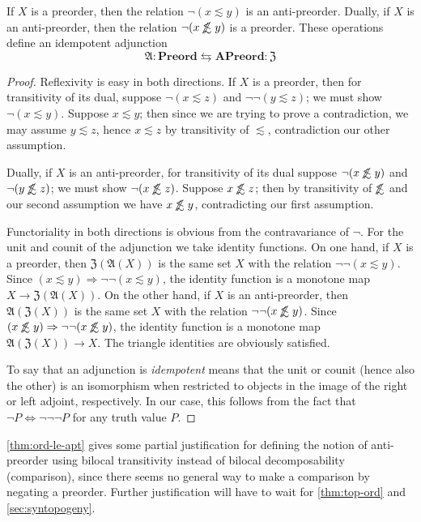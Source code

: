 \documentclass{article}
\def\oapt{\mathrel{\!\not\,\not\lesssim}}
\def\leapx{\lesssim}
\let\implies\Rightarrow
\def\anti{\mathfrak{A}}
\def\neigh{\mathfrak{Z}}
\def\Preord{\mathbf{Preord}}
\def\APreord{\mathbf{APreord}}
\begin{document}
\begin{thm}\label{thm:ord-le-apt}
  If $X$ is a preorder, then the relation $\neg(x\leapx y)$ is an anti-preorder.
  Dually, if $X$ is an anti-preorder, then the relation $\neg(x\oapt y)$ is a preorder.
  These operations define an idempotent adjunction
  \[\anti : \Preord \leftrightarrows \APreord : \neigh\]
\end{thm}
\begin{proof}
  Reflexivity is easy in both directions.
  If $X$ is a preorder, then for transitivity of its dual, suppose $\neg(x\leapx z)$ and $\neg\neg(y\leapx z)$; we must show $\neg(x\leapx y)$.
  Suppose $x\leapx y$; then since we are trying to prove a contradiction, we may assume $y\leapx z$, hence $x\leapx z$ by transitivity of $\leapx$, contradiction our other assumption.

  Dually, if $X$ is an anti-preorder, for transitivity of its dual suppose $\neg (x\oapt y)$ and $\neg (y\oapt z)$; we must show $\neg(x\oapt z)$.
  Suppose $x\oapt z$; then by transitivity of $\oapt$ and our second assumption we have $x\oapt y$, contradicting our first assumption.

  Functoriality in both directions is obvious from the contravariance of $\neg$.
  For the unit and counit of the adjunction we take identity functions.
  On one hand, if $X$ is a preorder, then $\neigh(\anti(X))$ is the same set $X$ with the relation $\neg\neg(x\leapx y)$.
  Since $(x\leapx y) \implies \neg\neg(x\leapx y)$, the identity function is a monotone map $X\to \neigh(\anti(X))$.
  On the other hand, if $X$ is an anti-preorder, then $\anti(\neigh(X))$ is the same set $X$ with the relation $\neg\neg(x\oapt y)$.
  Since $(x\oapt y) \implies \neg\neg(x\oapt y)$, the identity function is a monotone map $\anti(\neigh(X)) \to X$.
  The triangle identities are obviously satisfied.

  To say that an adjunction is \emph{idempotent} means that the unit or counit (hence also the other) is an isomorphism when restricted to objects in the image of the right or left adjoint, respectively.
  In our case, this follows from the fact that $\neg P \iff \neg\neg\neg P$ for any truth value $P$.
\end{proof}

\cref{thm:ord-le-apt} gives some partial justification for defining the notion of anti-preorder using bilocal transitivity instead of bilocal decomposability (comparison), since there seems no general way to make a comparison by negating a preorder.
Further justification will have to wait for \cref{thm:top-ord} and \cref{sec:syntopogeny}.
\end{document}
